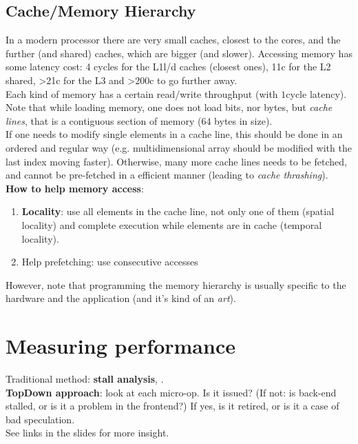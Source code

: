 \documentclass[../template.tex]{subfiles}
\begin{document}
\subsection{Cache/Memory Hierarchy}
In a modern processor there are very small caches, closest to the cores, and the further (and shared) caches, which are bigger (and slower). Accessing memory has some latency cost: 4 cycles for the L1l/d caches (closest ones), 11c for the L2 shared, >21c for the L3 and >200c to go further away.\\
Each kind of memory has a certain read/write throughput (with $1$cycle latency).\\

Note that while loading memory, one does not load bits, nor bytes, but \textit{cache lines}, that is a contiguous section of memory (64 bytes in size).\\

If one needs to modify single elements in a cache line, this should be done in an ordered and regular way (e.g. multidimensional array should be modified with the last index moving faster). Otherwise, many more cache lines needs to be fetched, and cannot be pre-fetched in a efficient manner (leading to \textit{cache thrashing}).\\

\textbf{How to help memory access}:
\begin{enumerate}
    \item \textbf{Locality}: use all elements in the cache line, not only one of them (spatial locality) and complete execution while elements are in cache (temporal locality). 
    \item Help prefetching: use consecutive accesses
\end{enumerate}
However, note that programming the memory hierarchy is usually specific to the hardware and the application (and it's kind of an \textit{art}).

\section{Measuring performance}
Traditional method: \textbf{stall analysis}, .\\
\textbf{TopDown approach}: look at each micro-op. Is it issued? (If not: is back-end stalled, or is it a problem in the frontend?) If yes, is it retired, or is it a case of bad speculation.\\ See links in the slides for more insight.\\
\end{document}
